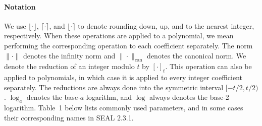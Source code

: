 \paragraph{Notation}

We use $\lfloor \cdot \rfloor$, $\lceil \cdot \rceil$, and
$\lfloor \cdot \rceil$ to denote rounding down, up, and to the
nearest integer, respectively. When these operations are applied
to a polynomial, we mean performing the corresponding operation
to each coefficient separately. The norm $\|\cdot\|$ denotes the
infinity norm and $\|\cdot\|_{\mathrm{can}}$ denotes the canonical
norm. We denote the reduction of an integer modulo
$t$ by $[\cdot]_t$. This operation can also be applied to
polynomials, in which case it is applied to every integer
coefficient separately. The reductions are always done into the
symmetric interval $[-t/2,t/2)$.
$\log_a$ denotes the base-$a$ logarithm, and $\log$ always denotes
the base-2 logarithm. Table~1 below lists commonly used parameters,
and in some cases their corresponding names in SEAL 2.3.1.

